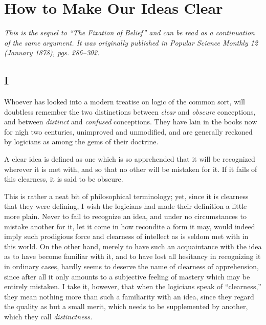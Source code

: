 \documentclass[]{article}
\begin{document}
\section*{How to Make Our Ideas Clear}
\emph{This is the sequel to ``The Fixation of Belief'' and can be read as a continuation of the same argument. It was originally published in \emph{Popular Science Monthly} 12 (January 1878), pgs. 286--302.}

\subsection*{I}

Whoever has looked into a modern treatise on logic of the common sort, will doubtless remember the two distinctions between \emph{clear} and \emph{obscure} conceptions, and between \emph{distinct} and \emph{confused} conceptions. They have lain in the books now for nigh two centuries, unimproved and unmodified, and are generally reckoned by logicians as among the gems of their doctrine.


A clear idea is defined as one which is so apprehended that it will be recognized wherever it is met with, and so that no other will be mistaken for it. If it fails of this clearness, it is said to be obscure.


This is rather a neat bit of philosophical terminology; yet, since it is clearness that they were defining, I wish the logicians had made their definition a little more plain. Never to fail to recognize an idea, and under no circumstances to mistake another for it, let it come in how recondite a form it may, would indeed imply such prodigious force and clearness of intellect as is seldom met with in this world. On the other hand, merely to have such an acquaintance with the idea as to have become familiar with it, and to have lost all hesitancy in recognizing it in ordinary cases, hardly seems to deserve the name of clearness of apprehension, since after all it only amounts to a subjective feeling of mastery which may be entirely mistaken. I take it, however, that when the logicians speak of ``clearness,'' they mean nothing more than such a familiarity with an idea, since they regard the quality as but a small merit, which needs to be supplemented by another, which they call \emph{distinctness.}
\end{document}

